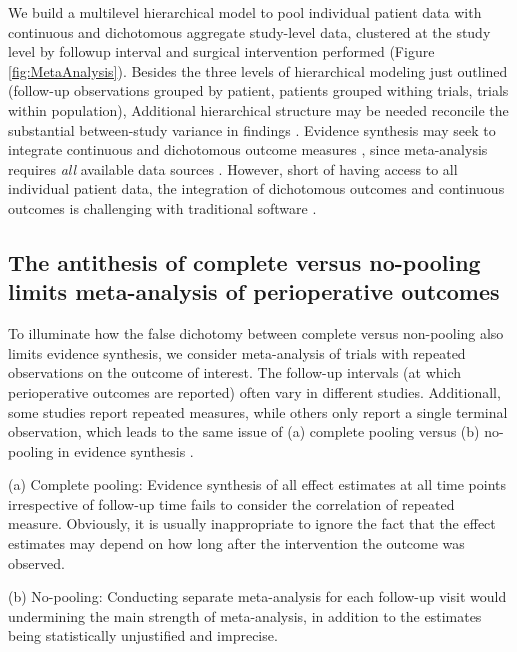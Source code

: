 \documentclass[11pt,notitlepage]{article}
\begin{document}
We build a multilevel hierarchical model to pool individual patient data with continuous and 
dichotomous aggregate study-level data, clustered at the study level by followup interval and surgical 
intervention performed (Figure \ref{fig:MetaAnalysis}). Besides the three levels of hierarchical modeling just outlined 
(follow-up observations grouped by patient, patients grouped withing trials, trials within population), 
Additional hierarchical structure may be needed reconcile the substantial between-study variance in findings \cite{Andreae2015}. 
Evidence synthesis may seek to integrate continuous and dichotomous outcome measures \cite{AndreaeJohnsonAbstract2013}, since
meta-analysis requires \textit{all} available data sources \cite{Deeks2011chapter}. However, short of having access to all individual patient data, 
the integration of dichotomous outcomes and continuous outcomes is challenging with traditional software
\cite{Andreae2015, Roth2015CriticalCare}. 

\subsection*{The antithesis of complete versus no-pooling limits meta-analysis of perioperative outcomes}
To illuminate how the false dichotomy between complete versus non-pooling also limits evidence 
synthesis, we consider meta-analysis of trials with repeated observations on the outcome of interest. 
The follow-up intervals (at which perioperative outcomes are reported) 
often vary in different studies. Additionall, some studies report repeated measures, while
others only report a single terminal observation, which leads to the same issue of (a) complete pooling 
versus (b) no-pooling in evidence synthesis 
\cite{Roth2015CriticalCare}.

(a) Complete pooling:
Evidence synthesis of all effect estimates at all time points irrespective of follow-up time 
fails to consider the correlation of repeated measure. Obviously, it is usually inappropriate 
to ignore the fact that the effect estimates may depend on how long after the intervention the outcome was observed.

(b) No-pooling: Conducting separate meta-analysis for each follow-up visit would undermining the main 
strength of meta-analysis, in addition to the estimates being statistically unjustified and imprecise.
\end{document}
